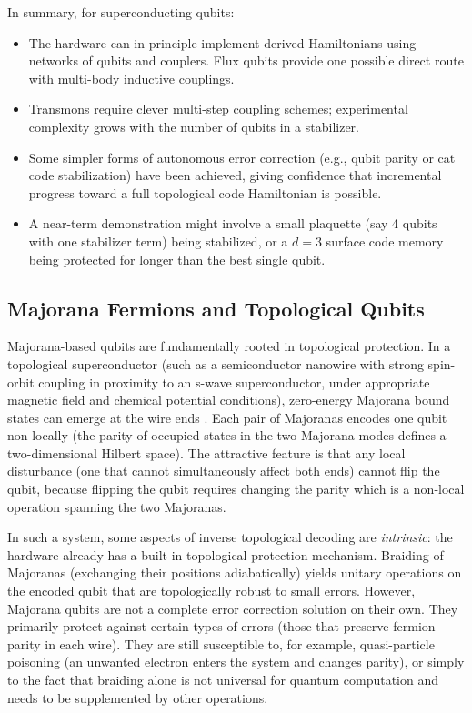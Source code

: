 \documentclass[11pt]{article}
\begin{document}
In summary, for superconducting qubits:
\begin{itemize}
    \item The hardware can in principle implement derived Hamiltonians using networks of qubits and couplers. Flux qubits provide one possible direct route with multi-body inductive couplings.
    \item Transmons require clever multi-step coupling schemes; experimental complexity grows with the number of qubits in a stabilizer.
    \item Some simpler forms of autonomous error correction (e.g., qubit parity or cat code stabilization) have been achieved, giving confidence that incremental progress toward a full topological code Hamiltonian is possible.
    \item A near-term demonstration might involve a small plaquette (say 4 qubits with one stabilizer term) being stabilized, or a $d=3$ surface code memory being protected for longer than the best single qubit. 
\end{itemize}

\subsection{Majorana Fermions and Topological Qubits}
Majorana-based qubits are fundamentally rooted in topological protection. In a topological superconductor (such as a semiconductor nanowire with strong spin-orbit coupling in proximity to an s-wave superconductor, under appropriate magnetic field and chemical potential conditions), zero-energy Majorana bound states can emerge at the wire ends \cite{Alicea2012}. Each pair of Majoranas encodes one qubit non-locally (the parity of occupied states in the two Majorana modes defines a two-dimensional Hilbert space). The attractive feature is that any local disturbance (one that cannot simultaneously affect both ends) cannot flip the qubit, because flipping the qubit requires changing the parity which is a non-local operation spanning the two Majoranas.

In such a system, some aspects of inverse topological decoding are \emph{intrinsic}: the hardware already has a built-in topological protection mechanism. Braiding of Majoranas (exchanging their positions adiabatically) yields unitary operations on the encoded qubit that are topologically robust to small errors. However, Majorana qubits are not a complete error correction solution on their own. They primarily protect against certain types of errors (those that preserve fermion parity in each wire). They are still susceptible to, for example, quasi-particle poisoning (an unwanted electron enters the system and changes parity), or simply to the fact that braiding alone is not universal for quantum computation and needs to be supplemented by other operations.
\end{document}
